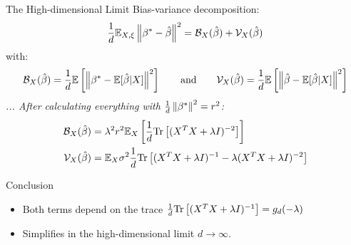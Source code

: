 \documentclass[10pt]{beamer}
\begin{document}
\begin{frame}{The High-dimensional Limit}
  Bias-variance decomposition:
\begin{align}
  \frac{1}{d} \mathbb E_{X,\xi} \left\lVert\beta^*-\hat \beta\right\rVert^2 = \mathcal B_X(\hat \beta) +  \mathcal V_X(\hat \beta)
\end{align}
with:
\begin{equation*}
  \mathcal B_X(\hat \beta) = \frac{1}{d} \mathbb E\left[ \left\lVert \beta^* - \mathbb E[\hat \beta|X]\right\rVert^2 \right]
  \qquad \text{and} \qquad
  \mathcal V_X(\hat \beta) = \frac{1}{d}  \mathbb E\left[  \left\lVert \hat \beta - \mathbb E[\hat \beta|X]\right\rVert^2 \right]
\end{equation*}
\emph{... After calculating everything with $ \frac{1}{d}\left\lVert\beta^*\right\rVert^2 = r^2$:}
\begin{align}\label{eq:simple-bias}
  \mathcal B_X(\hat \beta) 
  & = \lambda^2 r^2 \mathbb E_X \left[ \frac{1}{d} \text{Tr}\left[ (X^T X + \lambda I)^{-2} \right] \right]\\
  \mathcal V_X(\hat \beta)
  & = \mathbb E_X \sigma^2 \frac{1}{d} \text{Tr}\left[ (X^T X + \lambda I)^{-1} - \lambda (X^T X + \lambda I)^{-2} \right]
\end{align}
\begin{alertblock}{Conclusion}
  \begin{itemize}
    \item Both terms depend on the trace
    $\frac{1}{d}\text{Tr}\left[(X^T X + \lambda I)^{-1}\right]= g_d(-\lambda) $
    \item Simplifies in the high-dimensional limit $d \to \infty$.
  \end{itemize}
\end{alertblock}
\end{frame}
\end{document}
